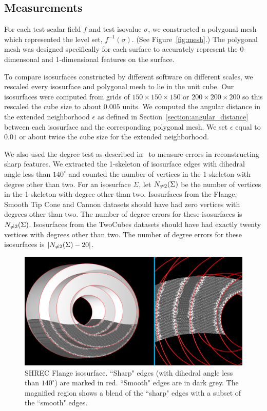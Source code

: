 \subsection{Measurements}
\label{section:measure}

For each test scalar field $f$ and test isovalue $\sigma$,
we constructed a polygonal mesh which represented the level set,
$f^{-1}(\sigma)$.
(See Figure~\ref{fig:mesh}.)
The polygonal mesh was designed specifically for each surface
to accurately represent the 0-dimensonal and 1-dimensional features
on the surface.

To compare isosurfaces constructed by different software on different scales,
we rescaled every isosurface and polygonal mesh to lie in the unit cube.
Our isosurfaces were computed from grids 
of $150 \times 150 \times 150$ or $200 \times 200 \times 200$
so this rescaled the cube size to about $0.005$ units.
We computed the angular distance in the extended neighborhood $\epsilon$
as defined in Section~\ref{section:angular_distance}
between each isosurface and the corresponding polygonal mesh.
We set $\epsilon$ equal to $0.01$ or about twice the cube size
for the extended neighborhood.

We also used the degree test as described in~\cite{bw-cisec-13}
to measure errors in reconstructing sharp features.
We extracted the 1-skeleton of isosurface edges with dihedral angle 
less than $140^\circ$ and counted the number of vertices in the 1-skeleton
with degree other than two.
For an isosurface $\Sigma$,
let $N_{\neq 2}(\Sigma)$ be the number of vertices in the 1-skeleton
with degree other than two.
Isosurfaces from the Flange, Smooth Tip Cone and Cannon datasets
should have had zero vertices with degrees other than two.
The number of degree errors for these isosurfaces is $N_{\neq 2}(\Sigma)$.
Isosurfaces from the TwoCubes datasets should have had exactly
twenty vertices with degrees other than two.
The number of degree errors for these isosurfaces is $|N_{\neq 2}(\Sigma)-20|$.

\begin{figure}[tb]
\includegraphics[width=\linewidth]{images/shrecFlangeCombine2.eps}
\caption{SHREC Flange isosurface. ``Sharp" edges (with dihedral angle less than $140^\circ$) are marked in red. 
``Smooth" edges are in dark grey. The magnified region shows a blend of the ``sharp" edges with a subset of the ``smooth" edges.}
\label{fig:flange1}
\end{figure}


